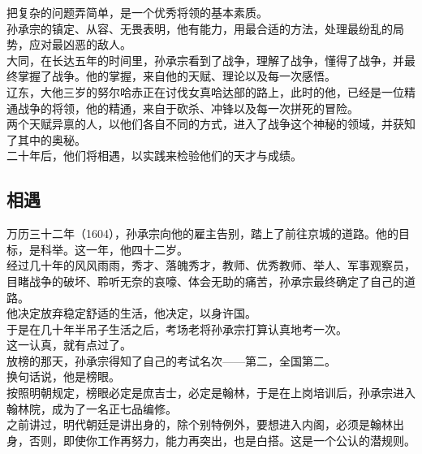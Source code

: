 \begin{multicols}{\theparacolNo}
把复杂的问题弄简单，是一个优秀将领的基本素质。\\

孙承宗的镇定、从容、无畏表明，他有能力，用最合适的方法，处理最纷乱的局势，应对最凶恶的敌人。\\

大同，在长达五年的时间里，孙承宗看到了战争，理解了战争，懂得了战争，并最终掌握了战争。他的掌握，来自他的天赋、理论以及每一次感悟。\\

辽东，大他三岁的努尔哈赤正在讨伐女真哈达部的路上，此时的他，已经是一位精通战争的将领，他的精通，来自于砍杀、冲锋以及每一次拼死的冒险。\\

两个天赋异禀的人，以他们各自不同的方式，进入了战争这个神秘的领域，并获知了其中的奥秘。\\

二十年后，他们将相遇，以实践来检验他们的天才与成绩。\\

\subsection{相遇}
万历三十二年（1604），孙承宗向他的雇主告别，踏上了前往京城的道路。他的目标，是科举。这一年，他四十二岁。\\

经过几十年的风风雨雨，秀才、落魄秀才，教师、优秀教师、举人、军事观察员，目睹战争的破坏、聆听无奈的哀嚎、体会无助的痛苦，孙承宗最终确定了自己的道路。\\

他决定放弃稳定舒适的生活，他决定，以身许国。\\

于是在几十年半吊子生活之后，考场老将孙承宗打算认真地考一次。\\

这一认真，就有点过了。\\

放榜的那天，孙承宗得知了自己的考试名次——第二，全国第二。\\

换句话说，他是榜眼。\\

按照明朝规定，榜眼必定是庶吉士，必定是翰林，于是在上岗培训后，孙承宗进入翰林院，成为了一名正七品编修。\\

之前讲过，明代朝廷是讲出身的，除个别特例外，要想进入内阁，必须是翰林出身，否则，即使你工作再努力，能力再突出，也是白搭。这是一个公认的潜规则。\\


\end{multicols}
